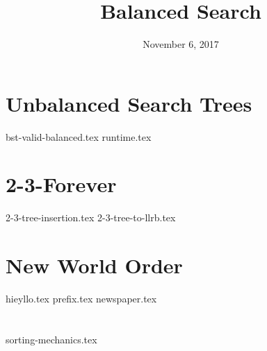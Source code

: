 \documentclass[11pt]{exam}
\title{Balanced Search}
\date{November 6, 2017}
\begin{document}
\maketitle

\section{Unbalanced Search Trees}
\begin{questions}
{bst-valid-balanced.tex}
{runtime.tex}
\end{questions}

\section{2-3-Forever}
\begin{questions}
{2-3-tree-insertion.tex}
{2-3-tree-to-llrb.tex}
\end{questions}

\section{New World Order}
\begin{questions}
{hieyllo.tex}
{prefix.tex}
{newspaper.tex}
\end{questions}

\clearpage

\section{}
\begin{questions}
{sorting-mechanics.tex}
\end{questions}
\end{document}
